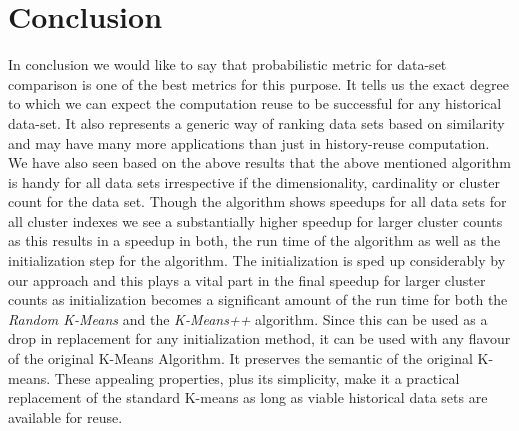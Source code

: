 \chapter{Conclusion}
\label{chap-seven}

In conclusion we would like to say that probabilistic metric for data-set comparison is
one of the best metrics for this purpose. It tells us the exact degree to which we can
expect the computation reuse to be successful for any historical data-set. It also represents a generic way of ranking data sets based on similarity and may have many more applications than just in history-reuse computation. We have also seen based on the above
results that the above mentioned algorithm is handy for all data sets irrespective if the dimensionality, cardinality or cluster count for the data set.
Though the algorithm shows speedups for all data sets for all cluster indexes we see a substantially higher speedup for larger cluster counts as this results in a speedup in both, the run time of the algorithm as well as the initialization step for the algorithm. The initialization is sped up considerably by our approach and this plays a vital part in the final speedup for larger cluster counts as initialization becomes a significant amount of the run time for both the \textit{Random K-Means} and the \textit{K-Means++} algorithm.
Since this can be used as a drop in replacement for any initialization method, it can be used with any flavour of the original K-Means Algorithm. It preserves the semantic of the original K-means. These appealing properties, plus its simplicity, make it a
practical replacement of the standard K-means as long as viable historical data sets are available for reuse.
